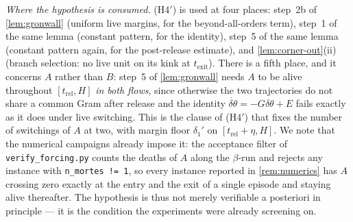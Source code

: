 \documentclass[11pt]{article}
\theoremstyle{definition}
\theoremstyle{remark}
\newcommand{\texit}{t_{\mathrm{exit}}}
\newcommand{\trel}{t_{\mathrm{rel}}}
\begin{document}
\begin{enumerate}
\emph{Where the hypothesis is consumed.} (H4$'$) is used at four places: step~2b
of \cref{lem:gronwall} (uniform live margins, for the beyond-all-orders term),
step~1 of the same lemma (constant pattern, for the identity), step~5 of the same
lemma (constant pattern again, for the post-release estimate), and
\cref{lem:corner-out}(ii) (branch selection: no live unit on its kink at
$\texit$). There is a fifth place, and it concerns $A$ rather than $B$: step~5 of
\cref{lem:gronwall} needs $A$ to be alive throughout $[\trel,H]$ \emph{in both
flows}, since otherwise the two trajectories do not share a common Gram after
release and the identity $\dot{\delta\theta}=-G\delta\theta+E$ fails exactly as
it does under live switching. This is the clause of (H4$'$) that fixes the number
of switchings of $A$ at two, with margin floor $\delta_1'$ on
$[\trel+\eta,H]$. We note that the numerical campaigns already impose it: the
acceptance filter of \texttt{verify\_forcing.py} counts the deaths of $A$ along
the $\beta$-run and rejects any instance with \verb|n_mortes != 1|, so every
instance reported in \cref{rem:numerics} has $A$ crossing zero exactly at the
entry and the exit of a single episode and staying alive thereafter. The
hypothesis is thus not merely verifiable a posteriori in principle --- it is the
condition the experiments were already screening on.


\end{enumerate}
\end{document}
